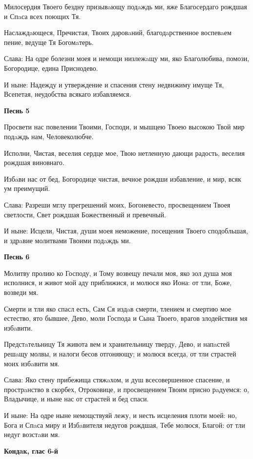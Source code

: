 Милосердия Твоего бездну призывaющу подaждь ми, яже Благосердаго рождшая и Спaса всех поющих Тя.


Наслаждaющеся, Пречистая, Твоих даровaний, благодaрственное воспевaем пение, ведуще Тя Богомaтерь.


Слава: На одре болезни моея и немощи низлежaщу ми, яко Благолюбива, помози, Богородице, едина Приснодево.


И ныне: Надежду и утверждение и спасения стену недвижиму имуще Тя, Всепетая, неудобства всякаго избавляемся.


\medskip
\bfseries Песнь 5\normalfont{}


Просвети нас повелении Твоими, Господи, и мышцею Твоею высокою Твой мир подaждь нам, Человеколюбче.

Исполни, Чистая, веселия сердце мое, Твою нетленную дающи радость, веселия рождшая виновнаго.

Избaви нас от бед, Богородице чистая, вечное рождши избавление, и мир, всяк ум преимущий.

Слава: Разреши мглу прегрешений моих, Богоневесто, просвещением Твоея светлости, Свет рождшая Божественный и превечный.

И ныне: Исцели, Чистая, души моея неможение, посещения Твоего сподобльшая, и здрaвие молитвами Твоими подaждь ми.


\medskip
\bfseries Песнь 6\normalfont{}


Молитву пролию ко Господу, и Тому возвещу печали моя, яко зол душа моя исполнися, и живот мой аду приближися, и молюся яко Иона: от тли, Боже, возведи мя.


Смерти и тли яко спасл есть, Сам Ся издaв смерти, тлением и смертию мое естество, ято бывшее, Дево, моли Господа и Сына Твоего, врагов злодействия мя избaвити.


Предстaтельницу Тя живота вем и хранительницу тверду, Дево, и напaстей решaщу молвы, и налоги бесов отгоняющу; и молюся всегда, от тли страстей моих избaвити мя.


Слава: Яко стену прибежища стяжaхом, и душ всесовершенное спасение, и прострaнство в скорбех, Отроковице, и просвещением Твоим присно рaдуемся: о, Владычице, и ныне нас от страстей и бед спаси.


И ныне: На одре ныне немощствуяй лежу, и несть исцеления плоти моей: но, Бога и Спaса миру и Избaвителя недугов рождшая, Тебе молюся, Благой: от тли недуг возстaви мя.


\medskip
\bfseries Кондaк, глас 6-й\normalfont{}


